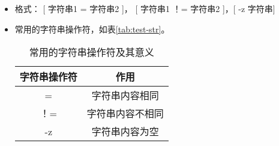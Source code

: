 \begin{enumerate}
\begin{enumerate}
        \begin{itemize}
                \item 格式： [ 字符串1 = 字符串2 ]， [ 字符串1 ！= 字符串2 ]，[ -z 字符串]
                \item 常用的字符串操作符，如表\ref{tab:test-str}。
                  \begin{table}[h]
                   \centering
                   \caption{常用的字符串操作符及其意义}
                     \begin{tabular*}{1\textwidth}{@{\extracolsep{\fill}}cc}
                     \toprule
                     字符串操作符     &作用              \\
                     \midrule
                       =            &字符串内容相同          \\
                     ！=            &字符串内容不相同      \\
                      -z            &字符串内容为空     \\


\end{tabular*}
\end{table}
\end{itemize}
\end{enumerate}
\end{enumerate}
